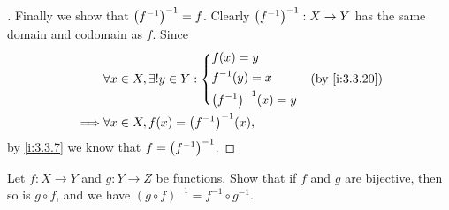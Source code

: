 \begin{proof}[]
  Finally we show that \(\left\lparen f^{-1}\right\rparen^{-1} = f\).
  Clearly \(\left\lparen f^{-1}\right\rparen^{-1} : X \to Y\) has the same domain and codomain as \(f\).
  Since
  \begin{align*}
             & \forall x \in X, \exists! y \in Y : \begin{dcases}
                                                     f(x) = y      \\
                                                     f^{-1}(y) = x \\
                                                     \pa{f^{-1}}^{-1}(x) = y
                                                   \end{dcases} &  & \by{i:3.3.20} \\
    \implies & \forall x \in X, f(x) = \pa{f^{-1}}^{-1}(x),
  \end{align*}
  by \cref{i:3.3.7} we know that \(f = \left\lparen f^{-1}\right\rparen^{-1}\).
\end{proof}

\begin{ex}\label{i:ex:3.3.7}
  Let \(f : X \to Y\) and \(g : Y \to Z\) be functions.
  Show that if \(f\) and \(g\) are bijective, then so is \(g \circ f\), and we have \((g \circ f)^{-1} = f^{-1} \circ g^{-1}\).
\end{ex}


